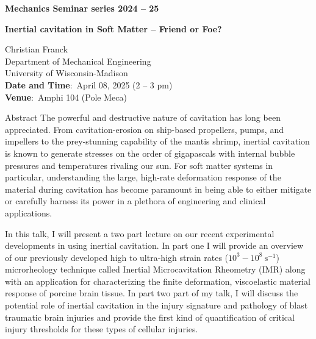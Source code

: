 \documentclass[a4paper,12pt,fleqn]{article}
\begin{document}
	\sffamily
\thispagestyle{titlepage}
\vspace*{-2em}
\begin{center}
	\huge \textbf{Mechanics Seminar series 2024 -- 25}
\end{center}

\begin{center}
	\Large 
	\textbf{Inertial cavitation in Soft Matter – Friend or Foe?} 
\end{center}
\begin{center}
	\large
	Christian Franck \\ 
	{\large Department of Mechanical Engineering \\
		University of Wisconsin-Madison
	} \\
	\vspace*{1em}
	\textbf{Date and Time}:~April 08, 2025 (2 -- 3 pm) \\
	\textbf{Venue}:~Amphi 104 (Pole Meca) 
\end{center}

\begin{myhlbox}{{\large Abstract}}
	The powerful and destructive nature of cavitation has long been appreciated. From cavitation-erosion on ship-based propellers, pumps, and impellers to the prey-stunning capability of the mantis shrimp, inertial cavitation is known to generate stresses on the order of gigapascals with internal bubble pressures and temperatures rivaling our sun. For soft matter systems in particular, understanding the large, high-rate deformation response of the material during cavitation has become paramount in being able to either mitigate or carefully harness its power in a plethora of engineering and clinical applications.
	 
	In this talk, I will present a two part lecture on our recent experimental developments in using inertial cavitation. In part one I will provide an overview of our previously developed  high to ultra-high strain rates ($10^{3} - 10^{8}~\text{s}^{-1}$) microrheology technique called Inertial Microcavitation Rheometry (IMR) along with an application for characterizing the finite deformation, viscoelastic material response of porcine brain tissue. In part two part of my talk, I will discuss the potential role of inertial cavitation in the injury signature and pathology of blast traumatic brain injuries and provide the first kind of quantification of critical injury thresholds for these types of cellular injuries. 
\end{myhlbox}
\end{document}
